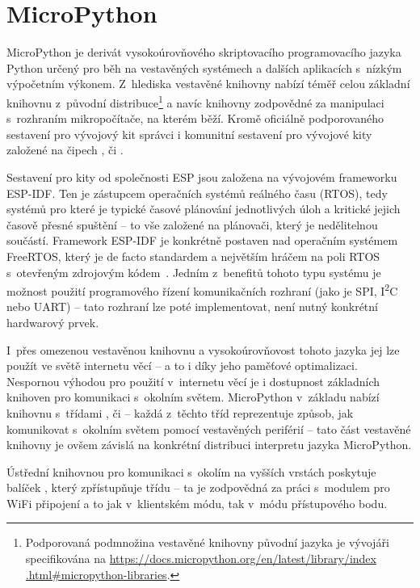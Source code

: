 \section{MicroPython}\label{sec:micropython}
MicroPython je derivát vysokoúrovňového skriptovacího programovacího jazyka Python určený pro běh na vestavěných
systémech a dalších aplikacích s~nízkým výpočetním výkonem.
Z~hlediska vestavěné knihovny nabízí téměř celou základní knihovnu z~původní distribuce\footnote{Podporovaná podmnožina
vestavěné knihovny původní jazyka je vývojáři specifikována na \url{https://docs.micropython.org/en/latest/library/index
.html\#micropython-libraries}.} a navíc knihovny
zodpovědné za manipulaci s~rozhraním mikropočítače, na kterém běží.
Kromě oficiálně podporovaného sestavení pro vývojový kit  správci i komunitní sestavení pro
vývojové kity založené na čipech ,  či .

Sestavení pro kity od společnosti ESP jsou založena na vývojovém frameworku ESP-IDF.
Ten je zástupcem operačních systémů reálného času (RTOS), tedy systémů pro které je typické časové plánování
jednotlivých úloh a kritické jejich časově přesné spuštění -- to vše založené na plánovači, který je
nedělitelnou součástí.
Framework ESP-IDF je konkrétně postaven nad operačním systémem FreeRTOS, který je de facto standardem a největším hráčem
na poli RTOS s~otevřeným zdrojovým kódem~\cite{RTOSSelection}.
Jedním z~benefitů tohoto typu systému je možnost použití programového řízení komunikačních rozhraní
(jako je SPI, I\textsuperscript{2}C nebo UART) -- tato rozhraní lze poté implementovat, není nutný konkrétní
hardwarový prvek.

I~přes omezenou vestavěnou knihovnu a vysokoúrovňovost tohoto jazyka jej lze použít ve světě internetu věcí --
a to i díky jeho paměťové optimalizaci.
Nespornou výhodou pro použití v~internetu věcí je i dostupnost základních knihoven pro komunikaci s~okolním světem.
MicroPython v~základu nabízí knihovnu  s~třídami ,  či  --
každá z~těchto tříd reprezentuje způsob, jak komunikovat s~okolním světem pomocí vestavěných periférií
-- tato část vestavěné knihovny je ovšem závislá na konkrétní distribuci interpretu jazyka MicroPython.

Ústřední knihovnou pro komunikaci s~okolím na vyšších vrstách poskytuje balíček , který zpřístupňuje
třídu  -- ta je zodpovědná za práci s~modulem pro WiFi připojení a to jak v~klientském módu, tak v~módu
přístupového bodu.


